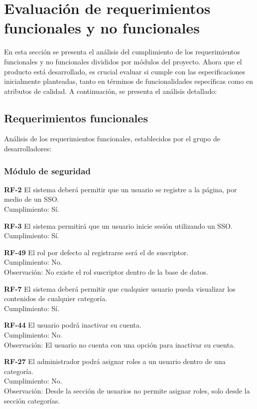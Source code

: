 \documentclass[10pt,times,twocolumn]{article}
\begin{document}
\section{Evaluación de requerimientos funcionales y no funcionales}

En esta sección se presenta el análisis del cumplimiento de los requerimientos funcionales y no funcionales divididos por módulos del proyecto. Ahora que el producto está desarrollado, es crucial evaluar si cumple con las especificaciones inicialmente planteadas, tanto en términos de funcionalidades específicas como en atributos de calidad. A continuación, se presenta el análisis detallado:

\subsection{Requerimientos funcionales}

Análisis de los requerimientos funcionales, establecidos por el grupo de desarrolladores:

\subsubsection{Módulo de seguridad}

\noindent \textbf{RF-2} El sistema deberá permitir que un usuario se registre a la página, por medio de un SSO.\\
Cumplimiento: Sí.

\noindent \textbf{RF-3} El sistema permitirá que un usuario inicie sesión utilizando un SSO.\\
Cumplimiento: Sí.

\noindent \textbf{RF-49} El rol por defecto al registrarse será el de suscriptor.\\
Cumplimiento: No.\\
Observación: No existe el rol suscriptor dentro de la base de datos.

\noindent \textbf{RF-7} El sistema deberá permitir que cualquier usuario pueda visualizar los contenidos de cualquier categoría.\\
Cumplimiento: Sí.

\noindent \textbf{RF-44} El usuario podrá inactivar su cuenta.\\
Cumplimiento: No.\\
Observación: El usuario no cuenta con una opción para inactivar su cuenta.

\noindent \textbf{RF-27} El administrador podrá asignar roles a un usuario dentro de una categoría.\\
Cumplimiento: No.\\
Observación: Desde la sección de usuarios no permite asignar roles, solo desde la sección categorías.
\end{document}
